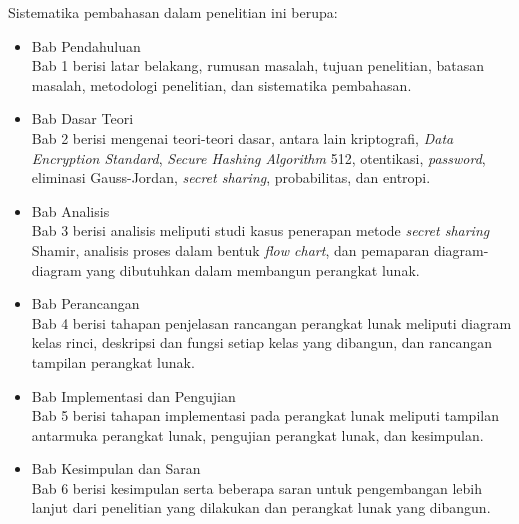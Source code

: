 Sistematika pembahasan dalam penelitian ini berupa:
\begin{itemize}
	\item Bab Pendahuluan
	\\Bab 1 berisi latar belakang, rumusan masalah, tujuan penelitian, batasan masalah, metodologi penelitian, dan sistematika pembahasan.
	\item Bab Dasar Teori
	\\Bab 2 berisi mengenai teori-teori dasar, antara lain kriptografi, \textit{Data Encryption Standard}, \textit{Secure Hashing Algorithm} 512, otentikasi, \textit{password}, eliminasi Gauss-Jordan, \textit{secret sharing}, probabilitas, dan entropi.
	\item Bab Analisis
	\\Bab 3 berisi analisis meliputi studi kasus penerapan metode \textit{secret sharing} Shamir, analisis proses dalam bentuk \textit{flow chart}, dan pemaparan diagram-diagram yang dibutuhkan dalam membangun perangkat lunak.
	\item Bab Perancangan
	\\Bab 4 berisi tahapan penjelasan rancangan perangkat lunak meliputi diagram kelas rinci, deskripsi dan fungsi setiap kelas yang dibangun, dan rancangan tampilan perangkat lunak.
	\item Bab Implementasi dan Pengujian
	\\Bab 5 berisi tahapan implementasi pada perangkat lunak meliputi tampilan antarmuka perangkat lunak, pengujian perangkat lunak, dan kesimpulan.
	\item Bab Kesimpulan dan Saran
	\\Bab 6 berisi kesimpulan serta beberapa saran untuk pengembangan lebih lanjut dari penelitian yang dilakukan dan perangkat lunak yang dibangun.
\end{itemize}